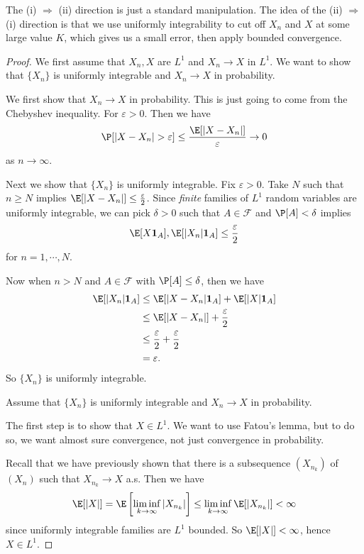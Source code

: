 \documentclass[a4paper]{article}
\begin{document}
The (i) $\Rightarrow$ (ii) direction is just a standard manipulation. The idea of the (ii) $\Rightarrow$ (i) direction is that we use uniformly integrability to cut off $X_n$ and $X$ at some large value $K$, which gives us a small error, then apply bounded convergence.
\begin{proof}
  We first assume that $X_n, X$ are $L^1$ and $X_n \to X$ in $L^1$. We want to show that $\{X_n\}$ is uniformly integrable and $X_n \to X$ in probability.

  We first show that $X_n \to X$ in probability. This is just going to come from the Chebyshev inequality. For $\varepsilon > 0$. Then we have
  \[
    \P[|X - X_n| > \varepsilon] \leq \frac{\E[|X - X_n|]}{\varepsilon} \to 0
  \]
  as $n \to \infty$.

  Next we show that $\{X_n\}$ is uniformly integrable. Fix $\varepsilon > 0$. Take $N$ such that $n \geq N$ implies $\E[|X - X_n|] \leq \frac{\varepsilon}{2}$. Since \emph{finite} families of $L^1$ random variables are uniformly integrable, we can pick $\delta > 0$ such that $A \in \mathcal{F}$ and $\P[A] < \delta$ implies
  \[
    \E[X \mathbf{1}_A], \E[|X_n|\mathbf{1}_A] \leq \frac{\varepsilon}{2}
  \]
  for $n = 1, \cdots, N$.

  Now when $n > N$ and $A \in \mathcal{F}$ with $\P[A] \leq \delta$, then we have
  \begin{align*}
    \E[|X_n| \mathbf{1}_A] &\leq \E[|X - X_n| \mathbf{1}_A] + \E[|X|\mathbf{1}_A]\\
    &\leq \E[|X - X_n|] + \frac{\varepsilon}{2}\\
    &\leq \frac{\varepsilon}{2} + \frac{\varepsilon}{2}\\
    &= \varepsilon.
  \end{align*}
  So $\{X_n\}$ is uniformly integrable.

  \separator

  Assume that $\{X_n\}$ is uniformly integrable and $X_n \to X$ in probability.

  The first step is to show that $X \in L^1$. We want to use Fatou's lemma, but to do so, we want almost sure convergence, not just convergence in probability.

  Recall that we have previously shown that there is a subsequence $(X_{n_k})$ of $(X_n)$ such that $X_{n_k} \to X$ a.s. Then we have
  \[
    \E[|X|] = \E\left[\liminf_{k \to \infty} |X_{n_k}|\right] \leq \liminf_{k \to \infty} \E[|X_{n_k}|] < \infty
  \]
  since uniformly integrable families are $L^1$ bounded. So $\E[|X|] < \infty$, hence $X \in L^1$.


\end{proof}
\end{document}
